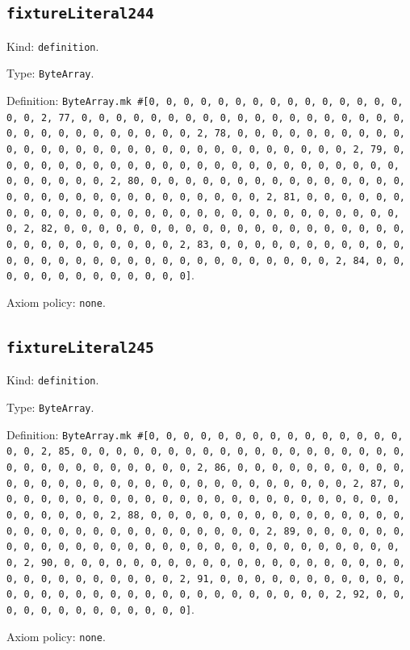 \documentclass[11pt]{article}
\begin{document}
\subsection*{\texttt{fixtureLiteral244}}
\noindent Kind: \texttt{definition}.\par
\noindent Type: \texttt{ByteArray}.\par
\noindent Definition: \texttt{ByteArray.mk \#[0, 0, 0, 0, 0, 0, 0, 0, 0, 0, 0, 0, 0, 0, 0, 0, 0, 2, 77, 0, 0, 0, 0, 0, 0, 0, 0, 0, 0, 0, 0, 0, 0, 0, 0, 0, 0, 0, 0, 0, 0, 0, 0, 0, 0, 0, 0, 0, 0, 2, 78, 0, 0, 0, 0, 0, 0, 0, 0, 0, 0, 0, 0, 0, 0, 0, 0, 0, 0, 0, 0, 0, 0, 0, 0, 0, 0, 0, 0, 0, 0, 2, 79, 0, 0, 0, 0, 0, 0, 0, 0, 0, 0, 0, 0, 0, 0, 0, 0, 0, 0, 0, 0, 0, 0, 0, 0, 0, 0, 0, 0, 0, 0, 2, 80, 0, 0, 0, 0, 0, 0, 0, 0, 0, 0, 0, 0, 0, 0, 0, 0, 0, 0, 0, 0, 0, 0, 0, 0, 0, 0, 0, 0, 0, 0, 2, 81, 0, 0, 0, 0, 0, 0, 0, 0, 0, 0, 0, 0, 0, 0, 0, 0, 0, 0, 0, 0, 0, 0, 0, 0, 0, 0, 0, 0, 0, 0, 2, 82, 0, 0, 0, 0, 0, 0, 0, 0, 0, 0, 0, 0, 0, 0, 0, 0, 0, 0, 0, 0, 0, 0, 0, 0, 0, 0, 0, 0, 0, 0, 2, 83, 0, 0, 0, 0, 0, 0, 0, 0, 0, 0, 0, 0, 0, 0, 0, 0, 0, 0, 0, 0, 0, 0, 0, 0, 0, 0, 0, 0, 0, 0, 2, 84, 0, 0, 0, 0, 0, 0, 0, 0, 0, 0, 0, 0, 0]}.\par
\noindent Axiom policy: \texttt{none}.\par
\subsection*{\texttt{fixtureLiteral245}}
\noindent Kind: \texttt{definition}.\par
\noindent Type: \texttt{ByteArray}.\par
\noindent Definition: \texttt{ByteArray.mk \#[0, 0, 0, 0, 0, 0, 0, 0, 0, 0, 0, 0, 0, 0, 0, 0, 0, 2, 85, 0, 0, 0, 0, 0, 0, 0, 0, 0, 0, 0, 0, 0, 0, 0, 0, 0, 0, 0, 0, 0, 0, 0, 0, 0, 0, 0, 0, 0, 0, 2, 86, 0, 0, 0, 0, 0, 0, 0, 0, 0, 0, 0, 0, 0, 0, 0, 0, 0, 0, 0, 0, 0, 0, 0, 0, 0, 0, 0, 0, 0, 0, 2, 87, 0, 0, 0, 0, 0, 0, 0, 0, 0, 0, 0, 0, 0, 0, 0, 0, 0, 0, 0, 0, 0, 0, 0, 0, 0, 0, 0, 0, 0, 0, 2, 88, 0, 0, 0, 0, 0, 0, 0, 0, 0, 0, 0, 0, 0, 0, 0, 0, 0, 0, 0, 0, 0, 0, 0, 0, 0, 0, 0, 0, 0, 0, 2, 89, 0, 0, 0, 0, 0, 0, 0, 0, 0, 0, 0, 0, 0, 0, 0, 0, 0, 0, 0, 0, 0, 0, 0, 0, 0, 0, 0, 0, 0, 0, 2, 90, 0, 0, 0, 0, 0, 0, 0, 0, 0, 0, 0, 0, 0, 0, 0, 0, 0, 0, 0, 0, 0, 0, 0, 0, 0, 0, 0, 0, 0, 0, 2, 91, 0, 0, 0, 0, 0, 0, 0, 0, 0, 0, 0, 0, 0, 0, 0, 0, 0, 0, 0, 0, 0, 0, 0, 0, 0, 0, 0, 0, 0, 0, 2, 92, 0, 0, 0, 0, 0, 0, 0, 0, 0, 0, 0, 0, 0]}.\par
\noindent Axiom policy: \texttt{none}.\par
\end{document}
